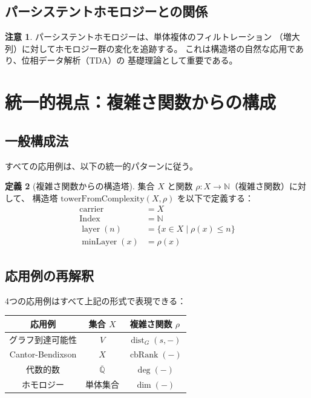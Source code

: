 \documentclass[a4paper,12pt]{ltjsarticle}
\theoremstyle{definition}
\newtheorem{definition}{定義}[section]
\newtheorem{remark}[definition]{注意}
\newcommand{\N}{\mathbb{N}}
\newcommand{\Q}{\mathbb{Q}}
\DeclareMathOperator{\layer}{layer}
\DeclareMathOperator{\minLayer}{minLayer}
\DeclareMathOperator{\dist}{dist}
\DeclareMathOperator{\deg}{deg}
\DeclareMathOperator{\cbRank}{cbRank}
\begin{document}
\subsection{パーシステントホモロジーとの関係}

\begin{remark}
パーシステントホモロジーは、単体複体のフィルトレーション
（増大列）に対してホモロジー群の変化を追跡する。
これは構造塔の自然な応用であり、位相データ解析（TDA）の
基礎理論として重要である。
\end{remark}

\section{統一的視点：複雑さ関数からの構成}

\subsection{一般構成法}

すべての応用例は、以下の統一的パターンに従う。

\begin{definition}[複雑さ関数からの構造塔]
集合 $X$ と関数 $\rho : X \to \N$（複雑さ関数）に対して、
構造塔 $\mathrm{towerFromComplexity}(X, \rho)$ を以下で定義する：
\begin{align*}
\mathrm{carrier} &= X \\
\mathrm{Index} &= \N \\
\layer(n) &= \{x \in X \mid \rho(x) \leq n\} \\
\minLayer(x) &= \rho(x)
\end{align*}
\end{definition}

\subsection{応用例の再解釈}

4つの応用例はすべて上記の形式で表現できる：

\begin{center}
\begin{tabular}{c|c|c}
応用例 & 集合 $X$ & 複雑さ関数 $\rho$ \\
\hline
グラフ到達可能性 & $V$ & $\dist_G(s, -)$ \\
Cantor-Bendixson & $X$ & $\cbRank(-)$ \\
代数的数 & $\overline{\Q}$ & $\deg(-)$ \\
ホモロジー & 単体集合 & $\dim(-)$ \\
\end{tabular}
\end{center}
\end{document}
